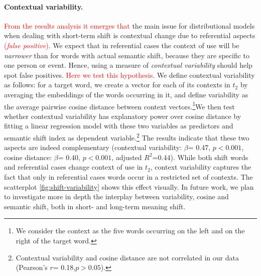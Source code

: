 \paragraph{Contextual variability.}


\textcolor{red}{From the results analysis it emerges that} the main issue for distributional models when dealing
with short-term shift is contextual change due to referential aspects \textcolor{red}{(\textit{false positive})}.
We expect that in referential cases the context of use will be \textit{narrower} than for words with actual semantic shift, because they are specific to one person or event. Hence, using a measure of \textit{contextual variability} should help spot false positives. \textcolor{red}{Here we test this hypothesis}. 
We define contextual variability as follows: for a target word, we create a vector for each of its contexts in $t_2$ by averaging the embeddings of the words  occurring in it, and define variability as the average pairwise cosine distance between context vectors.\footnote{We consider the context as the five words occurring on the left and on the right of the target word.}We then test whether contextual variability has explanatory power over cosine distance by fitting a linear regression model with these two variables as predictors and semantic shift index as dependent variable.\footnote{Contextual variability and cosine distance are not correlated in our data (Pearson's $r$= 0.18,$p> 0.05$). }
The results indicate that these two aspects are indeed complementary (contextual variability: $\beta$= 0.47, $p< 0.001$, cosine distance: $\beta$= 0.40, $p< 0.001$, adjusted $R^2$=0.44). While both shift words and referential cases change context of use in $t_2$, context variability captures the fact that only in referential cases words occur in a restricted set of contexts. The scatterplot \ref{fig:shift-variability} shows this effect visually. In future work, we plan to investigate more in depth the interplay between variability, cosine and semantic shift, both in short- and long-term meaning shift.

